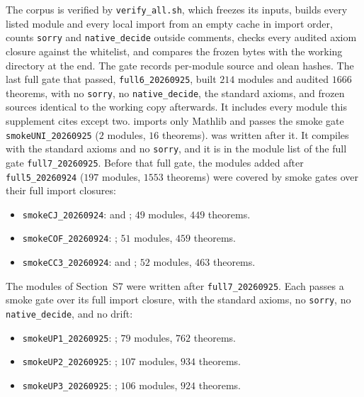 The corpus is verified by \texttt{verify\_all.sh}, which freezes its inputs, builds every
listed module and every local import from an empty cache in import order, counts
\texttt{sorry} and \texttt{native\_decide} outside comments, checks every audited axiom
closure against the whitelist, and compares the frozen bytes with the working directory at
the end. The gate records per-module source and olean hashes. The last full gate that passed,
\texttt{full6\_20260925}, built $214$ modules and audited $1666$ theorems, with no
\texttt{sorry}, no \texttt{native\_decide}, the standard axioms, and frozen sources identical to
the working copy afterwards. It includes every module this supplement cites except two.
 imports only Mathlib and passes the smoke gate
\texttt{smokeUNI\_20260925} ($2$ modules, $16$ theorems).  was
written after it. It compiles with the standard axioms and no \texttt{sorry}, and it is in the
module list of the full gate \texttt{full7\_20260925}. Before that full gate, the modules
added after \texttt{full5\_20260924} ($197$ modules, $1553$ theorems) were covered by smoke gates
over their full import closures:
\begin{itemize}
\item \texttt{smokeCJ\_20260924}:  and
; $49$ modules, $449$ theorems.
\item \texttt{smokeCOF\_20260924}: ; $51$ modules, $459$
theorems.
\item \texttt{smokeCC3\_20260924}:  and
; $52$ modules, $463$ theorems.
\end{itemize}
The modules of Section~S7 were written after \texttt{full7\_20260925}. Each passes a smoke gate
over its full import closure, with the standard axioms, no \texttt{sorry}, no
\texttt{native\_decide}, and no drift:
\begin{itemize}
\item \texttt{smokeUP1\_20260925}: ; $79$ modules, $762$ theorems.
\item \texttt{smokeUP2\_20260925}: ; $107$ modules, $934$ theorems.
\item \texttt{smokeUP3\_20260925}: ; $106$ modules, $924$ theorems.
\end{itemize}


